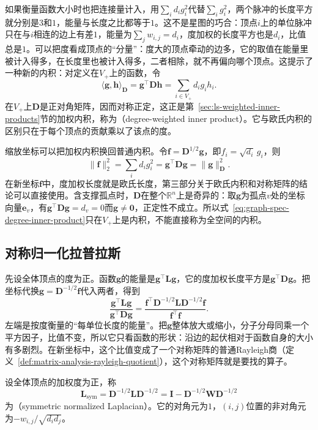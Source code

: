 如果衡量函数大小时也把连接量计入，用$\sum_id_ig_i^2$代替$\sum_ig_i^2$，两个脉冲的长度平方就分别是$3$和$1$，能量与长度之比都等于$1$。这不是星图的巧合：顶点$i$上的单位脉冲只在与$i$相连的边上有差$1$，能量为$\sum_jw_{i,j}=d_i$，度加权的长度平方也是$d_i$，比值总是$1$。可以把度看成顶点的“分量”：度大的顶点牵动的边多，它的取值在能量里被计入得多，在长度里也被计入得多，二者相除，就不再偏向哪个顶点。这提示了一种新的内积：对定义在$V_+$上的函数，令
\begin{equation}
 \langle\bm g,\bm h\rangle_{\bm D}=\bm g^{\top}\bm D\bm h=\sum_{i\in V_+}d_ig_ih_i .
 \label{eq:graph-spec-degree-inner-product}
\end{equation}
在$V_+$上$\bm D$是正对角矩阵，因而对称正定，这正是第~\ref{sec:ls-weighted-inner-products}节的加权内积，称为（degree-weighted inner product）。它与欧氏内积的区别只在于每个顶点的贡献乘以了该点的度。

缩放坐标可以把加权内积换回普通内积。令$\bm f=\bm D^{1/2}\bm g$，即$f_i=\sqrt{d_i}\,g_i$，则
\[
 \lVert\bm f\rVert_2^2=\sum_id_ig_i^2=\bm g^{\top}\bm D\bm g=\lVert\bm g\rVert_{\bm D}^2 .
\]
在新坐标$\bm f$中，度加权长度就是欧氏长度，第三部分关于欧氏内积和对称矩阵的结论可以直接使用。含支撑孤点时，$\bm D$在整个$\mathbb R^n$上是奇异的：取$\bm g$为孤点$v$处的坐标向量$\bm e_v$，有$\bm g^{\top}\bm D\bm g=d_v=0$而$\bm g\neq\bm0$，正定性不成立。所以式~\eqref{eq:graph-spec-degree-inner-product}只在$V_+$上是内积，不能直接称为全空间的内积。

\subsection{对称归一化拉普拉斯}
\label{sec:graph-spec-symmetric-normalized}

先设全体顶点的度为正。函数$\bm g$的能量是$\bm g^{\top}\bm L\bm g$，它的度加权长度平方是$\bm g^{\top}\bm D\bm g$。把坐标代换$\bm g=\bm D^{-1/2}\bm f$代入两者，得到
\[
 \frac{\bm g^{\top}\bm L\bm g}{\bm g^{\top}\bm D\bm g}
 =\frac{\bm f^{\top}\bm D^{-1/2}\bm L\bm D^{-1/2}\bm f}{\bm f^{\top}\bm f}.
\]
左端是按度衡量的“每单位长度的能量”。把$\bm g$整体放大或缩小，分子分母同乘一个平方因子，比值不变，所以它只看函数的形状：沿边的起伏相对于函数自身的大小有多剧烈。在新坐标中，这个比值变成了一个对称矩阵的普通Rayleigh商（定义~\ref{def:matrix-analysis-rayleigh-quotient}），这个对称矩阵就是要找的算子。

\begin{definition}[对称归一化拉普拉斯]
\label{def:graph-spec-symmetric-normalized-laplacian}
设全体顶点的加权度为正，称
\begin{equation}
 \bm L_{\mathrm{sym}}=\bm D^{-1/2}\bm L\bm D^{-1/2}=\bm I-\bm D^{-1/2}\bm W\bm D^{-1/2}
 \label{eq:graph-spec-symmetric-normalized-laplacian}
\end{equation}
为（symmetric normalized Laplacian）。它的对角元为$1$，$(i,j)$位置的非对角元为$-w_{i,j}/\sqrt{d_id_j}$。
\end{definition}

